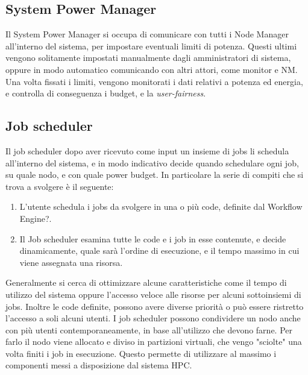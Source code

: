 \subsection{System Power Manager}
Il System Power Manager %
si occupa di comunicare con tutti i Node Manager all'interno del sistema, per impostare eventuali limiti di potenza. Questi ultimi vengono solitamente impostati manualmente dagli amministratori di sistema, oppure in modo automatico comunicando con altri attori, come monitor e NM. Una volta fissati i limiti, vengono monitorati i dati relativi a potenza ed energia, e controlla di conseguenza i budget, e la \emph{user-fairness}.
\subsection{Job scheduler}
Il job scheduler dopo aver ricevuto come input un insieme di jobs li schedula all'interno del sistema, e in modo indicativo decide quando schedulare ogni job, su quale nodo, e con quale power budget. In particolare la serie di compiti che si trova a svolgere è il seguente:
\begin{enumerate}
    \item L'utente schedula i jobs da svolgere in una o più code, definite dal Workflow Engine?. %
    \item Il Job scheduler esamina tutte le code e i job in esse contenute, e decide dinamicamente, quale sarà l'ordine di esecuzione, e il tempo massimo in cui viene assegnata una risorsa.
\end{enumerate}
Generalmente si cerca di ottimizzare alcune caratteristiche come il tempo di utilizzo del sistema oppure l'accesso veloce alle risorse per alcuni sottoinsiemi di jobs. Inoltre le code definite, possono avere diverse priorità o può essere ristretto l'accesso a soli alcuni utenti. I job scheduler possono condividere un nodo anche con più utenti contemporaneamente, in base all'utilizzo che devono farne. Per farlo il nodo viene allocato e diviso in partizioni virtuali, che vengo "sciolte" una volta finiti i job in esecuzione. Questo permette di utilizzare al massimo i componenti messi a disposizione dal sistema HPC.

